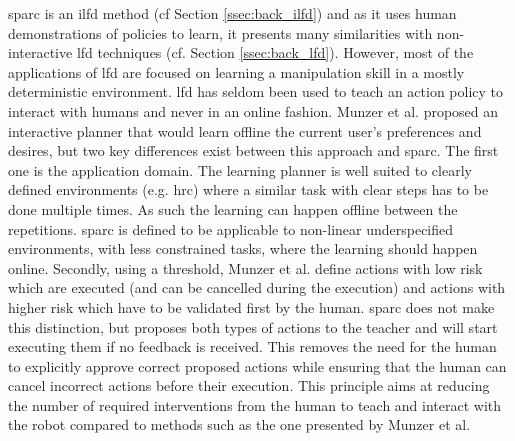 \gls{sparc} is an \gls{ilfd} method (cf Section \ref{ssec:back_ilfd}) and as it uses human demonstrations of policies to learn, it presents many similarities with non-interactive \gls{lfd} techniques (cf. Section \ref{ssec:back_lfd}). However, most of the applications of \gls{lfd} \citep{argall2009survey,billard2008robot} are focused on learning a manipulation skill in a mostly deterministic environment. \gls{lfd} has seldom been used to teach an action policy to interact with humans \citep{liu2014train,sequeira2016discovering,munzer2017efficient} and never in an online fashion. Munzer et al. proposed an interactive planner that would learn offline the current user's preferences and desires, but two key differences exist between this approach and \gls{sparc}. The first one is the application domain. The learning planner is well suited to clearly defined environments (e.g. \gls{hrc}) where a similar task with clear steps has to be done multiple times. As such the learning can happen offline between the repetitions. \gls{sparc} is defined to be applicable to non-linear underspecified environments, with less constrained tasks, where the learning should happen online. Secondly, using a threshold, Munzer et al. define actions with low risk which are executed (and can be cancelled during the execution) and actions with higher risk which have to be validated first by the human. \gls{sparc} does not make this distinction, but proposes both types of actions to the teacher and will start executing them if no feedback is received. This removes the  need for the human to explicitly approve correct proposed actions while ensuring that the human can cancel incorrect actions before their execution. This principle aims at reducing the number of required interventions from the human to teach and interact with the robot compared to methods such as the one presented by Munzer et al. 

    

